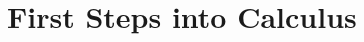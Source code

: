 \documentclass[11pt]{book}
\theoremstyle{definition}  %
\begin{document}
\renewcommand{\textinterrobang}{$! \! \! ?$}


\chapter{\sc First Steps into Calculus}


\end{document}
